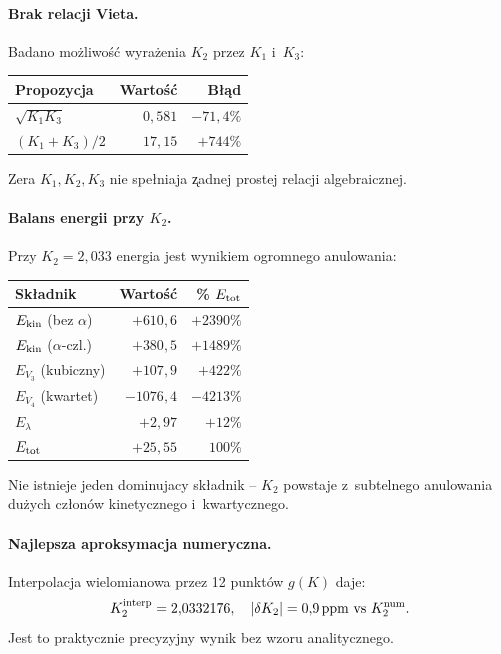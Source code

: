 \paragraph{Brak relacji Vieta.}
Badano mo\.zliwo\'s\'c wyra\.zenia $K_2$ przez $K_1$ i~$K_3$:
\begin{center}
\begin{tabular}{lrr}
\hline
Propozycja & Warto\'s\'c & B\l{}\k{a}d \\
\hline
$\sqrt{K_1 K_3}$ & $0{,}581$ & $-71{,}4\%$ \\
$(K_1+K_3)/2$    & $17{,}15$ & $+744\%$ \\
\hline
\end{tabular}
\end{center}
Zera $K_1,K_2,K_3$ nie spe\l{}niaja \k{z}adnej prostej relacji algebraicznej.

\paragraph{Balans energii przy $K_2$.}
Przy $K_2=2{,}033$ energia jest wynikiem ogromnego anulowania:
\begin{center}
\begin{tabular}{lrr}
\hline
Sk\l{}adnik & Warto\'s\'c & \% $E_{\rm tot}$ \\
\hline
$E_{\rm kin}$ (bez $\alpha$) & $+610{,}6$ & $+2390\%$ \\
$E_{\rm kin}$ ($\alpha$-czl.) & $+380{,}5$ & $+1489\%$ \\
$E_{V_3}$ (kubiczny)          & $+107{,}9$ & $+422\%$ \\
$E_{V_4}$ (kwartet)           & $-1076{,}4$ & $-4213\%$ \\
$E_\lambda$                   & $+2{,}97$  & $+12\%$ \\
\hline
$E_{\rm tot}$                 & $+25{,}55$ & $100\%$ \\
\hline
\end{tabular}
\end{center}
Nie istnieje jeden dominujacy sk\l{}adnik -- $K_2$ powstaje z~subtelnego
anulowania du\.zych cz\l{}on\'ow kinetycznego i~kwartycznego.

\paragraph{Najlepsza aproksymacja numeryczna.}
Interpolacja wielomianowa przez 12 punkt\'ow $g(K)$ daje:
\begin{equation}
  K_2^{\rm interp} = 2{,}0332176,\quad
  |\delta K_2| = 0{,}9\,\mathrm{ppm}\text{ vs }K_2^{\rm num}.
  \label{eq:K2-interp}
\end{equation}
Jest to praktycznie precyzyjny wynik bez wzoru analitycznego.

